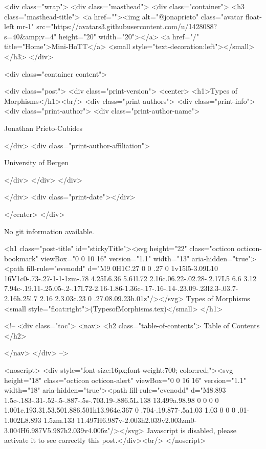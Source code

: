     <div class="wrap">
      <div class="masthead">
        <div class="container">
          <h3 class="masthead-title">
            <a href=""><img alt="@jonaprieto" class="avatar float-left mr-1" src="https://avatars3.githubusercontent.com/u/1428088?s=40&amp;v=4" height="20" width="20"></a>
            <a href="/" title="Home">Mini-HoTT</a>
            <small style="text-decoration:left"></small>
          </h3>
        </div>
      
      <div class="container content">
        







<div class="post">
  <div class="print-version">
    <center>
      <h1>Types of Morphisms</h1><br/>
        <div class="print-authors">
          <div class="print-info">
            <div class="print-author">
              <div class="print-author-name">
                
                  Jonathan Prieto-Cubides
                
              </div>
              <div class="print-author-affiliation">
                
                  University of Bergen
                
                </div>
            </div>
          </div>
          
          
        </div>
        <div class="print-date"></div>
        
        
    </center>
  </div>

  
  No git information available.
  

  <h1 class="post-title" id="stickyTitle"><svg height="22" class="octicon octicon-bookmark" viewBox="0 0 10 16" version="1.1" width="13" aria-hidden="true"><path fill-rule="evenodd" d="M9 0H1C.27 0 0 .27 0 1v15l5-3.09L10 16V1c0-.73-.27-1-1-1zm-.78 4.25L6.36 5.61l.72 2.16c.06.22-.02.28-.2.17L5 6.6 3.12 7.94c-.19.11-.25.05-.2-.17l.72-2.16-1.86-1.36c-.17-.16-.14-.23.09-.23l2.3-.03.7-2.16h.25l.7 2.16 2.3.03c.23 0 .27.08.09.23h.01z"/></svg> Types of Morphisms <small style="float:right">(TypesofMorphisms.tex)</small>
  </h1>

  <!-- 
  <div class="toc">
    <nav>
    <h2 class="table-of-contents"> Table of Contents </h2>
      

    </nav>
  </div>
   -->

  <noscript>
  <div style="font-size:16px;font-weight:700; color:red;"><svg height="18" class="octicon octicon-alert" viewBox="0 0 16 16" version="1.1" width="18" aria-hidden="true"><path fill-rule="evenodd" d="M8.893 1.5c-.183-.31-.52-.5-.887-.5s-.703.19-.886.5L.138 13.499a.98.98 0 0 0 0 1.001c.193.31.53.501.886.501h13.964c.367 0 .704-.19.877-.5a1.03 1.03 0 0 0 .01-1.002L8.893 1.5zm.133 11.497H6.987v-2.003h2.039v2.003zm0-3.004H6.987V5.987h2.039v4.006z"/></svg> Javascript is disabled, please activate it to see correctly this post.</div><br/>
  </noscript>

